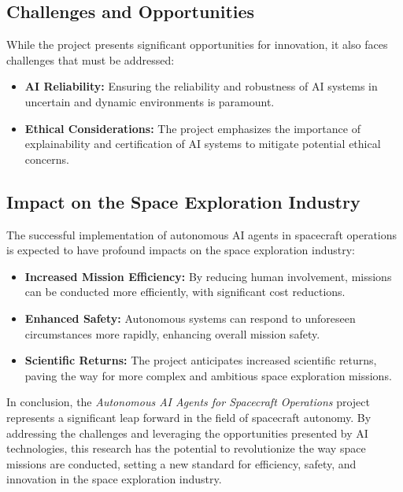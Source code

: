 \documentclass[a4paper,12pt]{article}
\begin{document}
\subsection{Challenges and Opportunities}

While the project presents significant opportunities for innovation, it also faces challenges that must be addressed:

\begin{itemize}
    \item \textbf{AI Reliability:} Ensuring the reliability and robustness of AI systems in uncertain and dynamic environments is paramount.
    \item \textbf{Ethical Considerations:} The project emphasizes the importance of explainability and certification of AI systems to mitigate potential ethical concerns.
\end{itemize}

\subsection{Impact on the Space Exploration Industry}

The successful implementation of autonomous AI agents in spacecraft operations is expected to have profound impacts on the space exploration industry:

\begin{itemize}
    \item \textbf{Increased Mission Efficiency:} By reducing human involvement, missions can be conducted more efficiently, with significant cost reductions.
    \item \textbf{Enhanced Safety:} Autonomous systems can respond to unforeseen circumstances more rapidly, enhancing overall mission safety.
    \item \textbf{Scientific Returns:} The project anticipates increased scientific returns, paving the way for more complex and ambitious space exploration missions.
\end{itemize}

In conclusion, the \textit{Autonomous AI Agents for Spacecraft Operations} project represents a significant leap forward in the field of spacecraft autonomy. By addressing the challenges and leveraging the opportunities presented by AI technologies, this research has the potential to revolutionize the way space missions are conducted, setting a new standard for efficiency, safety, and innovation in the space exploration industry.
\end{document}
